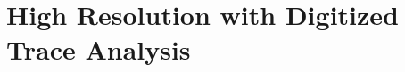 %
%
%
%
%
%
%
%
%
%
%
%
%
%
%
%
%
%
%
%
%


\section{High Resolution with Digitized Trace Analysis}

